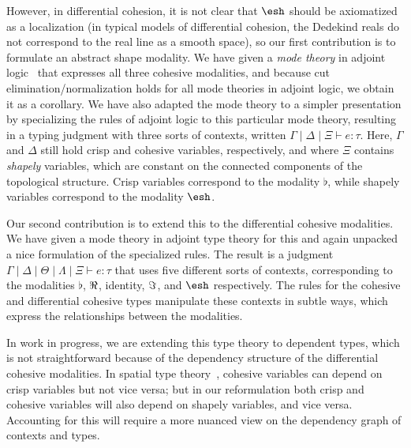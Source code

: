 \documentclass{article}
\begin{document}
{However, in differential cohesion, it is not clear that $\shape$ should be
axiomatized as a localization (in typical models of differential cohesion, the
Dedekind reals do not correspond to the real line as a smooth space), so our
first contribution is to formulate an abstract shape modality. We have given a
\emph{mode theory} in adjoint logic~\citep{Licata2017} that expresses all three
cohesive modalities, and because cut elimination/normalization holds for all
mode theories in adjoint logic, we obtain it as a corollary. We have also
adapted the mode theory to a simpler presentation by specializing the rules of
adjoint logic to this particular mode theory, resulting in a typing judgment
with three sorts of contexts, written
$\Gamma \mid \Delta \mid \Xi \vdash e : \tau$. Here, $\Gamma$ and $\Delta$ still
hold crisp and cohesive variables, respectively, and where $\Xi$ contains
\emph{shapely} variables, which are constant on the connected components of the
topological structure. Crisp variables correspond to the modality $\flat$, while
shapely variables correspond to the modality $\shape$.

Our second contribution is to extend this to the differential cohesive
modalities.  We have given a mode theory in adjoint type theory for this
and again unpacked a nice formulation of the specialized rules.  The
result is a judgment $\Gamma \mid \Delta \mid \Theta \mid \Lambda \mid
\Xi \vdash e : \tau$ that uses five different sorts of contexts,
corresponding to the modalities $\flat$, $\Re$, identity, $\Im$, and
$\shape$ respectively.  The rules for the cohesive and differential
cohesive types manipulate these contexts in subtle ways, which express
the relationships between the modalities.

In work in progress, we are extending this type theory to dependent types, which
is not straightforward because of the dependency structure of the differential
cohesive modalities. In spatial type theory~\citep{Shulman2015}, cohesive
variables can depend on crisp variables but not vice versa; but in our
reformulation both crisp and cohesive variables will also depend on shapely
variables, and vice versa. Accounting for this will require a more nuanced view
on the dependency graph of contexts and types.


}
\end{document}
